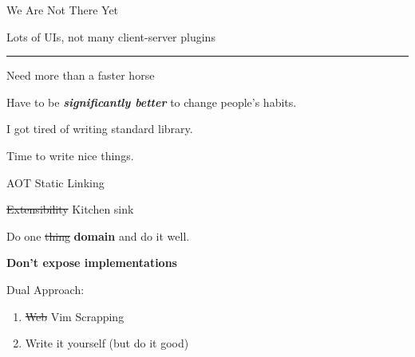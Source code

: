 \documentclass{beamer}
\begin{document}
\begin{frame}{We Are Not There Yet}

	Lots of UIs, not many client-server plugins

	\rule{\textwidth}{0.1em}

	Need more than a faster horse

	\hspace{0.1em}

	Have to be \textbf{\textit{significantly better}} to change people's habits.

\end{frame}


\begin{frame}[standout]

	I got tired of writing standard library.

	Time to write nice things.

\end{frame}


\begin{frame}{AOT Static Linking}

	\begin{block}{\st{Extensibility} Kitchen sink}

		\vspace{0.5em}

		Do one \st{thing} \textbf{domain} and do it well.

		\vspace{0.5em}

		\textbf{Don't expose implementations}

	\end{block}

	\hspace{0.1em}

	Dual Approach:

	\begin{enumerate}

		\item \st{Web} Vim Scrapping

		\item Write it yourself (but do it good)

	\end{enumerate}

\end{frame}
\end{document}
